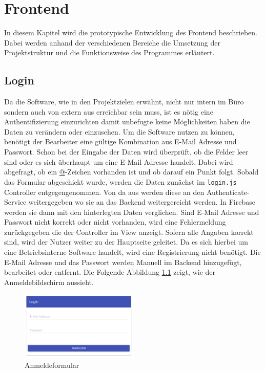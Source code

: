 \chapter{Frontend}
\label{chap_frontend}
In diesem Kapitel wird die prototypische Entwicklung des Frontend beschrieben. Dabei werden anhand der verschiedenen Bereiche die Umsetzung der
Projektstruktur und die Funktionsweise des Programmes erläutert.

\section{Login}
Da die Software, wie in den Projektzielen erwähnt, nicht nur intern im Büro sondern auch von extern aus erreichbar sein muss, ist es nötig eine Authentifizierung einzurichten damit unbefugte keine Möglichkeiten haben die Daten zu verändern oder einzusehen. Um die Software nutzen zu können, benötigt der Bearbeiter eine gültige Kombination aus E-Mail Adresse und Passwort. Schon bei der Eingabe der Daten wird überprüft, ob die Felder leer sind oder es sich überhaupt um eine E-Mail Adresse handelt. Dabei wird abgefragt, ob ein \url{@}-Zeichen vorhanden ist und ob darauf ein Punkt folgt.
Sobald das Formular abgeschickt wurde, werden die Daten zunächst im \texttt{login.js} Controller entgegengenommen. Von da aus werden diese an den Authenticate-Service weitergegeben wo sie an das Backend weitergereicht werden. In Firebase werden sie dann mit den hinterlegten Daten verglichen. Sind E-Mail Adresse und Passwort nicht korrekt oder nicht vorhanden, wird eine Fehlermeldung zurückgegeben die der Controller im View anzeigt. Sofern alle Angaben korrekt sind, wird der Nutzer weiter zu der Hauptseite geleitet.
Da es sich hierbei um eine Betriebsinterne Software handelt, wird eine Registrierung nicht benötigt. Die E-Mail Adresse und das Passwort werden Manuell im Backend hinzugefügt, bearbeitet oder entfernt. Die Folgende Abbildung \ref{frontend_login} zeigt, wie der Anmeldebildschirm aussieht. 

\begin{figure}[H]
\centering\includegraphics[width=0.5\textwidth]{images/frontend_login.png}
\caption{Anmeldeformular}
\label{frontend_login}
\end{figure}

